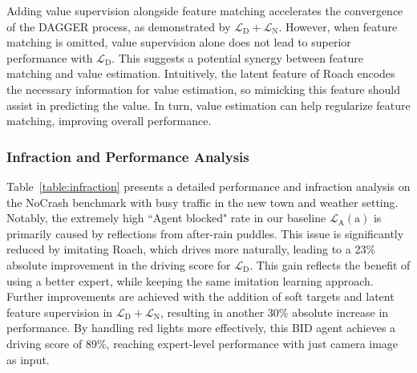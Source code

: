 %
Adding value supervision alongside feature matching accelerates the convergence of the DAGGER process, as demonstrated by $\mathcal{L}_\text{D} + \mathcal{L}_\text{N}$.
However, when feature matching is omitted, value supervision alone does not lead to superior performance with $\mathcal{L}_\text{D}$.
This suggests a potential synergy between feature matching and value estimation. 
Intuitively, the latent feature of Roach encodes the necessary information for value estimation, so mimicking this feature should assist in predicting the value. 
In turn, value estimation can help regularize feature matching, improving overall performance.


\subsubsection{Infraction and Performance Analysis}


\hspace{1pc}Table~\ref{table:infraction} presents a detailed performance and infraction analysis on the NoCrash benchmark with busy traffic in the new town and weather setting. 
Notably, the extremely high ``Agent blocked" rate in our baseline $\mathcal{L}_\text{A}(\text{a})$ is primarily caused by reflections from after-rain puddles. 
This issue is significantly reduced by imitating Roach, which drives more naturally, leading to a 23\% absolute improvement in the driving score for $\mathcal{L}_\text{D}$. 
This gain reflects the benefit of using a better expert, while keeping the same imitation learning approach. 
Further improvements are achieved with the addition of soft targets and latent feature supervision in $\mathcal{L}_\text{D}+\mathcal{L}_\text{N}$, resulting in another 30\% absolute increase in performance. 
By handling red lights more effectively, this BID agent achieves a driving score of 89\%, reaching expert-level performance with just camera image as input.





 